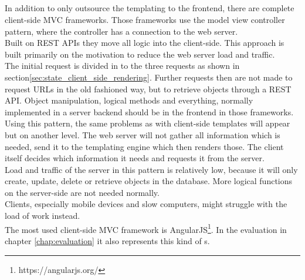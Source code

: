 \subsection{\ClientSideMVC{}\label{clientSideMVC}}
In addition to only outsource the templating to the frontend, there are complete client-side MVC frameworks.
Those frameworks use the model view controller pattern, where the controller has a connection to the web server.
\\
Built on REST APIs they move all logic into the client-side.
This approach is built primarily on the motivation to reduce the web server load and traffic.
\\
The initial request is divided in to the three requests as shown in section\ref{sec:state_client_side_rendering}.
Further requests then are not made to request URLs in the old fashioned way, but to retrieve objects through a REST API. 
Object manipulation, logical methods and everything, normally implemented in a server backend should be in the frontend in those frameworks.
\\
Using this pattern, the same problems as with client-side templates will appear but on another level.
The web server will not gather all information which is needed, send it to the templating engine which then renders those.
The client itself decides which information it needs and requests it from the server.
\\
Load and traffic of the server in this pattern is relatively low, because it will only create, update, delete or retrieve objects in the database. 
More logical functions on the server-side are not needed normally.
\\
Clients, especially mobile devices and slow computers, might struggle with the load of work instead.
\\
The most used client-side MVC framework is AngularJS\footnote{https://angularjs.org/}. In the evaluation in chapter \ref{chap:evaluation} it also represents this kind of \webApplication{}s.

